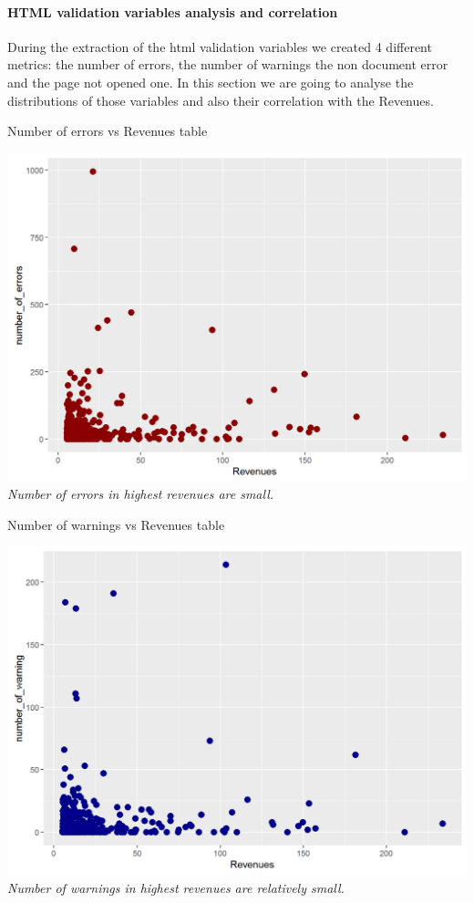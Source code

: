 \documentclass{article}
\begin{document}
\paragraph{HTML validation variables analysis and correlation}
During the extraction of the html validation variables we created 4 different metrics: the number of errors, the number of warnings the non document error and the page not opened one. In this section we are going to analyse the distributions of those variables and also their correlation with the Revenues.
\begin{table}[H]
\centering
\caption{Number of errors vs Revenues table}
\begin{center}
\includegraphics[scale=0.5]{../R/photos/45_errors_rev.png}    \\
\textit{Number of errors in highest revenues are small.}
\end{center}
\end{table}
\begin{table}[H]
\centering
\caption{Number of warnings vs Revenues table}
\begin{center}
\includegraphics[scale=0.5]{../R/photos/47_warn_rev.png}    \\
\textit{Number of warnings in highest revenues are relatively small.}
\end{center}
\end{table}
\end{document}
